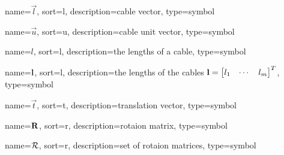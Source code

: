 	{%
		name=\ensuremath{\vec{l}},
		sort=l,
		description=cable vector,
		type=symbol
	}
	\newcommand{\cablevec}{\gls{sym:cablevec}}

	{%
		name=\ensuremath{\vec{u}},
		sort=u,
		description=cable unit vector,
		type=symbol
	}
	\newcommand{\cableuvec}{\gls{sym:cableuvec}}

	{%
		name=\ensuremath{l},
		sort=l,
		description=the lengths of a cable,
		type=symbol
	}
	\newcommand{\cablelength}{\gls{sym:cablelength}}

	{%
		name=\ensuremath{\mat{l}},
		sort=l,
		description=the lengths of the cables \ensuremath{\mat{l} = {\left[\begin{matrix}l_1 & \cdots & l_m \end{matrix}\right]}^T},
		type=symbol
	}
	\newcommand{\cablelengths}{\gls{sym:cablelengths}}

	{%
		name=\ensuremath{\vec{t}},
		sort=t,
		description=translation vector,
		type=symbol
	}
	\newcommand{\transvec}{\gls{sym:transvec}}

	{%
		name=\ensuremath{\mat{R}},
		sort=r,
		description=rotaion matrix,
		type=symbol
	}
	\newcommand{\rotmatbare}{\gls{sym:rotmat}}
	\newcommand{\rotmat}[2]{{\project{\rotmatbare}{#1}}_{#2}}

	{%
		name=\ensuremath{\set{R}},
		sort=r,
		description=set of rotaion matrices,
		type=symbol
}
\newcommand{\setofrotationmatrices}{\gls{sym:setofrotationmatrices}}

